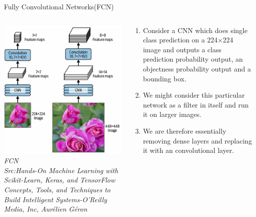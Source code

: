 \begin{frame}{Fully Convolutional Networks(FCN)}
	\begin{columns}[T]
        \begin{column}{0.4\textwidth}
        	\includegraphics[width=\textwidth]{images/FCN.png}
			\tiny{\textit{FCN\\ Src:Hands-On Machine Learning with Scikit-Learn, Keras, and TensorFlow  Concepts, Tools, and Techniques to Build Intelligent Systems-O'Reilly Media, Inc, Aurélien Géron }}
        \end{column}
		\begin{column}{0.6\textwidth}
			\begin{enumerate}[$\bullet$]
				\item Consider a CNN which does single class prediction on a 224$\times$224 image and outputs a class prediction probability output, an objectness probability output and a bounding box.\pause
				\item We might consider this particular network as a filter in itself and run it on larger images.\pause
				\item We are therefore essentially removing dense layers and replacing it with an convolutional layer.
			\end{enumerate}
		\end{column} 
    \end{columns}
\end{frame}

